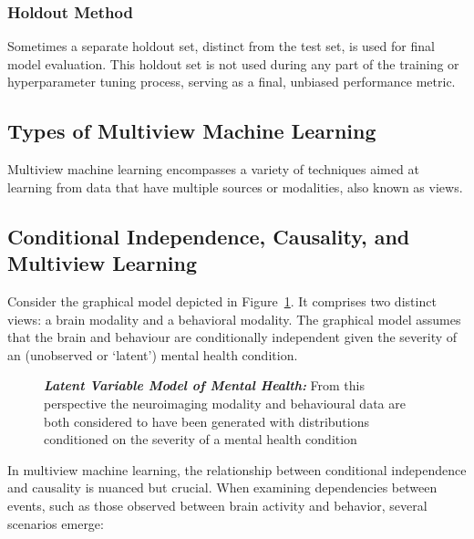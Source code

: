 \subsubsection{Holdout Method}

Sometimes a separate holdout set, distinct from the test set, is used for final model evaluation. This holdout set is not used during any part of the training or hyperparameter tuning process, serving as a final, unbiased performance metric.

\subsection{Types of Multiview Machine Learning}

Multiview machine learning encompasses a variety of techniques aimed at learning from data that have multiple sources or modalities, also known as \gls{views}.

\subsection{Conditional Independence, Causality, and Multiview Learning}

Consider the graphical model depicted in Figure~\ref{fig:mentalhealthselfsupervised}.
It comprises two distinct \gls{views}: a brain modality and a behavioral modality.
The graphical model assumes that the brain and behaviour are conditionally independent given the severity of an (unobserved or `latent') mental health condition.

\begin{figure}
    \centering
    \caption[Latent Variable Model of Mental Health]{\textit{\textbf{Latent Variable Model of Mental Health:}} From this perspective the neuroimaging modality and behavioural data are both considered to have been generated with distributions conditioned on the severity of a mental health condition}\label{fig:mentalhealthselfsupervised}
\end{figure}

In multiview machine learning, the relationship between conditional independence and causality is nuanced but crucial.
When examining dependencies between events, such as those observed between brain activity and behavior, several scenarios emerge:

